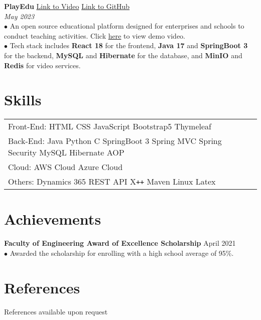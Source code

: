 \documentclass[letterpaper,12pt]{article}
\begin{document}
\textbf{PlayEdu} \hfill \href{https://youtu.be/8IWqM2eHLhc}{Link to Video} \hspace{0.2cm} \href{https://github.com/Zicheng-Li/React-Spring_Boot-PlayEdu}{Link to GitHub} \\
\textit{May 2023} \\
\hspace{0.1cm} $\bullet$ An open source educational platform designed for enterprises and schools to conduct teaching activities. Click \href{https://youtu.be/8IWqM2eHLhc}{here} to view demo video.\\
\hspace{0.1cm} $\bullet$ Tech stack includes \textbf{React 18} for the frontend, \textbf{Java 17} and \textbf{SpringBoot 3} for the backend, \textbf{MySQL} and \textbf{Hibernate} for the database, and \textbf{MinIO} and \textbf{Redis} for video services.

\section{Skills}
\begin{tabularx}{\linewidth}{@{}l X@{}}
Front-End: \hspace{0.05cm} HTML \hspace{0.05cm} CSS \hspace{0.2cm} JavaScript \hspace{0.2cm} Bootstrap5 \hspace{0.2cm} Thymeleaf \\
Back-End: \hspace{0.05cm} Java \hspace{0.1cm} Python \hspace{0.1cm} C \hspace{0.1cm} SpringBoot 3 \hspace{0.05cm} Spring MVC \hspace{0.1cm} Spring Security \hspace{0.1cm} MySQL \hspace{0.1cm} Hibernate \hspace{0.1cm} AOP \\
Cloud:  \hspace{0.75cm} AWS Cloud \hspace{0.2cm} Azure Cloud \hspace{0.6cm}  \\
Others: \hspace{0.57cm} Dynamics 365 \hspace{0.1cm} REST API \hspace{0.15cm} X\texttt{++} \hspace{0.1cm} Maven \hspace{0.1cm} Linux \hspace{0.1cm} Latex \\
\end{tabularx}

\section{Achievements}
\textbf{Faculty of Engineering Award of Excellence Scholarship}  \hfill  \normalsize{April 2021} \\
$\bullet$ Awarded the scholarship for enrolling with a high school average of 95\%.
\section{References}
References available upon request
\end{document}
